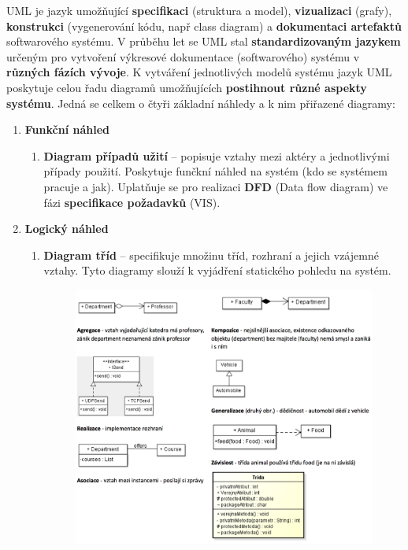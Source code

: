 UML je jazyk umožňující \textbf{specifikaci} (struktura a model), \textbf{vizualizaci} (grafy), \textbf{konstrukci} (vygenerování kódu, např class diagram) a \textbf{dokumentaci artefaktů} softwarového systému. V průběhu let se UML stal \textbf{standardizovaným jazykem }určeným pro vytvoření výkresové dokumentace (softwarového) systému v \textbf{různých fázích vývoje}. K vytváření jednotlivých modelů systému jazyk UML poskytuje celou řadu diagramů umožňujících \textbf{postihnout různé aspekty systému}. Jedná se celkem o čtyři základní náhledy a k nim přiřazené diagramy: 

\begin{enumerate}
\item \textbf{Funkční náhled}
\begin{enumerate}
\item \textbf{Diagram případů užití} -- popisuje vztahy mezi aktéry a jednotlivými případy použití. Poskytuje funčkní náhled na systém (kdo se systémem pracuje a jak). Uplatňuje se pro realizaci \textbf{DFD} (Data flow diagram) ve fázi \textbf{specifikace požadavků} (VIS).
\end{enumerate}
\item \textbf{Logický náhled}
\begin{enumerate}
\item \textbf{Diagram tříd} -- specifikuje množinu tříd, rozhraní a jejich vzájemné vztahy. Tyto diagramy slouží k vyjádření statického pohledu na systém.
\begin{figure}[H]
	\centering
	\includegraphics[width=.9\textwidth]{assets/class.png}
\end{figure}

\end{enumerate}
\end{enumerate}
